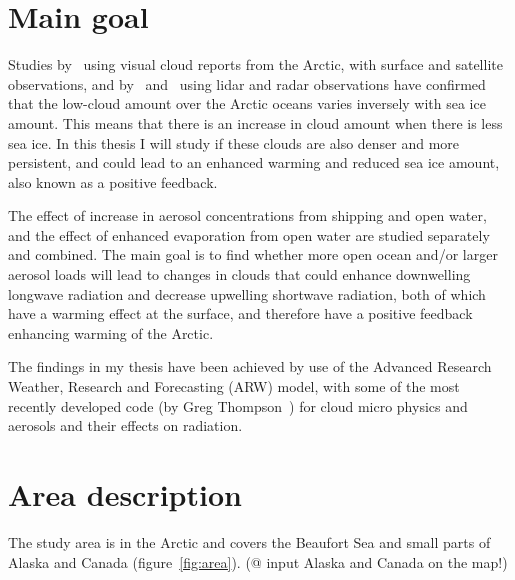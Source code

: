 \section{Main goal}
Studies by~\citet{Eastman2010b} using visual cloud reports from the Arctic, with surface and satellite observations, and by~\citet{Kay2009} and~\citet{Palm2010} using lidar and radar observations have confirmed that the low-cloud amount over the Arctic oceans varies inversely with sea ice amount. This means that there is an increase in cloud amount when there is less sea ice. In this thesis I will study if these clouds are also denser and more persistent, and could lead to an enhanced warming and reduced sea ice amount, also known as a positive feedback.

The effect of increase in aerosol concentrations from shipping and open water, and the effect of enhanced evaporation from open water are studied separately and combined. The main goal is to find whether more open ocean and/or larger aerosol loads will lead to changes in clouds that could enhance downwelling longwave radiation and decrease upwelling shortwave radiation, both of which have a warming effect at the surface, and therefore have a positive feedback enhancing warming of the Arctic.


The findings in my thesis have been achieved by use of the Advanced Research Weather, Research and Forecasting (ARW) model, with some of the most recently developed code (by Greg Thompson~\citep{Thompson2014}) for cloud micro physics and aerosols and their effects on radiation.%

\section{Area description}
The study area is in the Arctic and covers the Beaufort Sea and small parts of Alaska and Canada (figure~\ref{fig:area}). (@ input Alaska and Canada on the map!)

